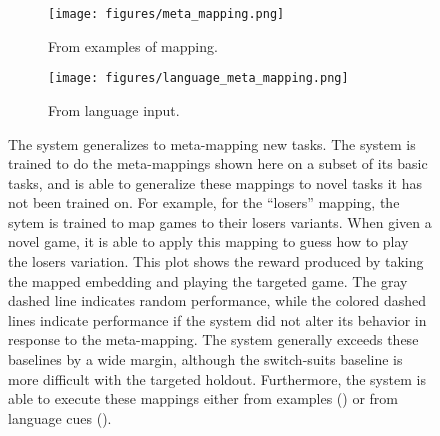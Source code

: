\documentclass{article}
\begin{document}
\begin{figure}
\centering
\begin{subfigure}{0.5\textwidth}
\texttt{[image: figures/meta\_mapping.png]}
\caption{From examples of mapping.}
\label{cards_meta_map_results_examples}
\end{subfigure}%
\begin{subfigure}{0.5\textwidth}
\texttt{[image: figures/language\_meta\_mapping.png]}
\caption{From language input.}
\label{cards_meta_map_results_language}
\end{subfigure}
\caption{The system generalizes to meta-mapping new tasks. The system is trained to do the meta-mappings shown here on a subset of its basic tasks, and is able to generalize these mappings to novel tasks it has not been trained on. For example, for the ``losers'' mapping, the sytem is trained to map games to their losers variants. When given a novel game, it is able to apply this mapping to guess how to play the losers variation. This plot shows the reward produced by taking the mapped embedding and playing the targeted game. The gray dashed line indicates random performance, while the colored dashed lines indicate performance if the system did not alter its behavior in response to the meta-mapping. The system generally exceeds these baselines by a wide margin, although the switch-suits baseline is more difficult with the targeted holdout. Furthermore, the system is able to execute these mappings either from examples () or from language cues ().}
\label{cards_meta_map_results}
\end{figure}
\end{document}

